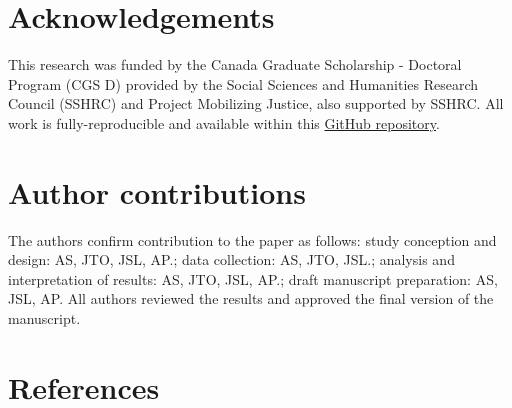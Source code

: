 \documentclass[10pt,letterpaper]{article}
\begin{document}
\hypertarget{acknowledgements}{%
\section{Acknowledgements}\label{acknowledgements}}

This research was funded by the Canada Graduate Scholarship - Doctoral
Program (CGS D) provided by the Social Sciences and Humanities Research
Council (SSHRC) and Project Mobilizing Justice, also supported by SSHRC.
All work is fully-reproducible and available within this
\href{https://github.com/soukhova/Madrid-ZBE-LEZ}{GitHub repository}.

\hypertarget{author-contributions}{%
\section{Author contributions}\label{author-contributions}}

The authors confirm contribution to the paper as follows: study
conception and design: AS, JTO, JSL, AP.; data collection: AS, JTO,
JSL.; analysis and interpretation of results: AS, JTO, JSL, AP.; draft
manuscript preparation: AS, JSL, AP. All authors reviewed the results
and approved the final version of the manuscript.

\hypertarget{references}{%
\section*{References}\label{references}}
\end{document}
